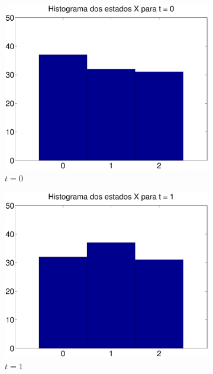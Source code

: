 \documentclass{report}
\begin{document}
\begin{figure}[H]
	\centering
	\begin{subfigure}{0.4\textwidth}
		\centering
		\includegraphics[width = \textwidth]{Q1_d_histograma_x_0}
		\caption{$t = 0$}
	\end{subfigure}
	\begin{subfigure}{0.4\textwidth}
		\centering
		\includegraphics[width = \textwidth]{Q1_d_histograma_x_1}
		\caption{$t = 1$}
	\end{subfigure}
	\begin{subfigure}{0.4\textwidth}
		\centering

\end{subfigure}
\end{figure}
\end{document}
